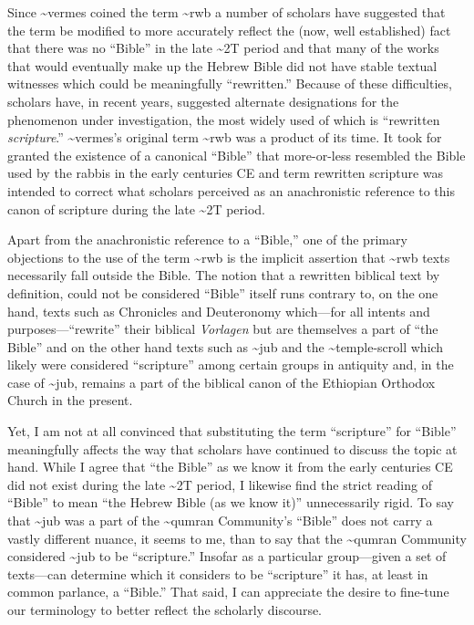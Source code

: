 Since \textasciitilde{}vermes coined the term \textasciitilde{}rwb a
number of scholars have suggested that the term be modified to more
accurately reflect the (now, well established) fact that there was no
``Bible'' in the late \textasciitilde{}2T period and that many of the
works that would eventually make up the Hebrew Bible did not have stable
textual witnesses which could be meaningfully ``rewritten.'' Because of
these difficulties, scholars have, in recent years, suggested alternate
designations for the phenomenon under investigation, the most widely
used of which is ``rewritten \emph{scripture}.''
\textasciitilde{}vermes's original term \textasciitilde{}rwb was a
product of its time. It took for granted the existence of a canonical
``Bible'' that more-or-less resembled the Bible used by the rabbis in
the early centuries CE and term rewritten scripture was intended to
correct what scholars perceived as an anachronistic reference to this
canon of scripture during the late \textasciitilde{}2T
period.\autocites[58--59]{campbell_zsengeller2014}[See
also][]{ulrich_mcdonald-sanders2002}[and][]{ulrich_zsengeller2014}

Apart from the anachronistic reference to a ``Bible,'' one of the
primary objections to the use of the term \textasciitilde{}rwb is the
implicit assertion that \textasciitilde{}rwb texts necessarily fall
outside the Bible.\autocite[61]{campbell_zsengeller2014} The notion that
a rewritten biblical text by definition, could not be considered
``Bible'' itself runs contrary to, on the one hand, texts such as
Chronicles and Deuteronomy which---for all intents and
purposes---``rewrite'' their biblical \emph{Vorlagen} but are themselves
a part of ``the Bible'' and on the other hand texts such as
\textasciitilde{}jub and the \textasciitilde{}temple-scroll which likely
were considered ``scripture'' among certain groups in antiquity and, in
the case of \textasciitilde{}jub, remains a part of the biblical canon
of the Ethiopian Orthodox Church in the present.

Yet, I am not at all convinced that substituting the term ``scripture''
for ``Bible'' meaningfully affects the way that scholars have continued
to discuss the topic at hand. While I agree that ``the Bible'' as we
know it from the early centuries CE did not exist during the late
\textasciitilde{}2T period, I likewise find the strict reading of
``Bible'' to mean ``the Hebrew Bible (as we know it)'' unnecessarily
rigid. To say that \textasciitilde{}jub was a part of the
\textasciitilde{}qumran Community's ``Bible'' does not carry a vastly
different nuance, it seems to me, than to say that the
\textasciitilde{}qumran Community considered \textasciitilde{}jub to be
``scripture.'' Insofar as a particular group---given a set of
texts---can determine which it considers to be ``scripture'' it has, at
least in common parlance, a ``Bible.'' That said, I can appreciate the
desire to fine-tune our terminology to better reflect the scholarly
discourse.

